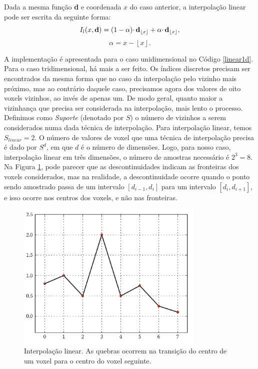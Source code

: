 \documentclass[12pt, a4paper, oneside]{book}
\begin{document}
Dada a mesma função {\bf d} e coordenada $x$ do caso anterior, a interpolação linear pode ser escrita da seguinte forma:
\[
I_{l}(x, {\bf d}) = (1 - \alpha) \cdotp {\bf d}_{\left\lfloor x \right\rfloor} + \alpha \cdotp {\bf d}_{\left\lfloor x \right\rfloor},\]
\[
\alpha = x - \left\lfloor x \right\rfloor.
\]

A implementação é apresentada para o caso unidimensional no Código \ref{linear1d}. Para o caso tridimensional, há mais a ser feito. Os índices discretos precisam ser encontrados da mesma forma que no caso da interpolação pelo vizinho mais próximo, mas ao contrário daquele caso, precisamos agora dos valores de oito voxels vizinhos, ao invés de apenas um. De modo geral, quanto maior a vizinhança que precisa ser considerada na interpolação, mais lento o processo. Definimos como \emph{Suporte} (denotado por $S$) o número de vizinhos a serem considerados numa dada técnica de interpolação. Para interpolação linear, temos $S_{linear} = 2$. O número de valores de voxel que uma técnica de interpolação precisa é dado por $S^{d}$, em que $d$ é o número de dimensões. Logo, para nosso caso, interpolação linear em três dimensões, o número de amostras necessário é $2^{3} = 8$. Na Figura \ref{linearInterp}, pode parecer que as descontinuidades indicam as fronteiras dos voxels considerados, mas na realidade, a descontinuidade ocorre quando o ponto sendo amostrado passa de um intervalo $[d_{i-1}, d_{i}]$ para um intervalo $[d_{i}, d_{i+1}]$, e isso ocorre nos centros dos voxels, e não nas fronteiras.



\begin{figure}[!htb]
\center
\includegraphics[width=9cm]{linear}
\caption{Interpolação linear. As quebras ocorrem na transição do centro de um voxel para o centro do voxel seguinte.}
\label{linearInterp}
\end{figure}
\end{document}

